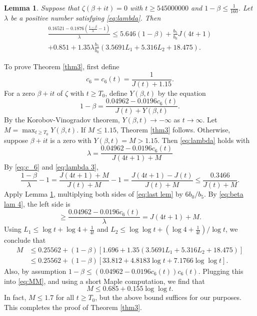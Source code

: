 \documentclass[10pt]{amsart}
\theoremstyle{remark}
\theoremstyle{plain}
\newtheorem{lemma}{Lemma}[section]
\numberwithin{equation}{section}
\theoremstyle{definition}
\def\lam{\lambda}
\newcommand{\be}{\begin{equation}}
\begin{document}
%
%

\begin{lemma}\label{lem:zero inequality clas}
Suppose that $\zeta(\beta+it)=0$ with $t\ge 545000000$ and $1-\beta\le 
\tfrac{1}{160}$.  Let $\lam$ be a positive number satisfying \eqref{eq:lambda}.
 Then
\begin{multline}
\frac{0.16521-0.1876(\tfrac{1-\beta}{\lam}-1)}{\lam} \le 5.646(1-\beta)
   +\frac{b_5}{b_0} J(4t+1) \\
+ 0.851+ 1.35\lam \frac{b_5}{b_0} (3.5691L_1+5.316L_2+18.475).
\label{eq:last lem}
\end{multline}
\end{lemma}

To prove Theorem \ref{thm3}, first define
\be
c_6 = c_6(t) = \frac{1}{J(t)+1.15}.
\label{eq:c_6}
\end{equation}
For a zero $\beta+it$ of $\zeta$ with $t\ge T_0$, define $Y(\beta,t)$ by
the equation
$$
1-\beta = \frac{0.04962-0.0196 c_6(t)}{J(t) + Y(\beta,t)}.
$$
By the Korobov-Vinogradov theorem, $Y(\beta,t) \to -\infty$ as $t\to \infty$.
Let $M=\max_{t\ge T_0} Y(\beta,t)$.  If $M \le 1.15$, Theorem \ref{thm3}
follows.  Otherwise, suppose $\beta+it$ is a zero with $Y(\beta,t)=M>1.15$.
Then \eqref{eq:lambda} holds with
\be
\lam = \frac{0.04962-0.0196 c_6(t)}{J(4t+1)+M}
\label{eq:lambda 3}
\end{equation}
By \eqref{eq:c_6} and \eqref{eq:lambda 3},
\be
\frac{1-\beta}{\lam}-1  = \frac{J(4t+1)+M}{J(t)+M}-1=\frac{J(4t+1)-J(t)}
{J(t)+M} \le \frac{0.3466}{J(t)+M}.
\label{eq:beta lam 4}
\end{equation}
Apply Lemma \ref{lem:zero inequality clas}, multiplying both sides of
\eqref{eq:last lem} by $6b_0/b_5$.  By \eqref{eq:beta lam 4}, the left side is
$$
\ge \frac{0.04962-0.0196c_6(t)}{\lam} = J(4t+1)+M.
$$
Using $L_1 \le \log t + \log 4 + \frac{1}{4t}$ and $L_2 \le \log\log t +
(\log 4 + \frac{1}{4t})/\log t$, we conclude that
\be
\begin{split}
M&\le 0.25562+(1-\beta) \left[ 1.696+1.35(3.5691L_1+5.316L_2+18.475) \right] \\
&\le 0.25562+(1-\beta) \left[ 33.812+4.8183\log t + 7.1766\log\log t \right].
\end{split}
\label{eq:MM}
\end{equation}
Also, by assumption $1-\beta \le (0.04962-0.0196c_6(t)) c_6(t)$. 
Plugging this into \eqref{eq:MM}, and using a short Maple computation,
we find that 
$$
M \le 0.685+0.155\log\log t.
$$
In fact, $M\le 1.7$ for all $t\ge T_0$, but the above bound suffices for 
our purposes.  This completes the proof of Theorem \ref{thm3}.
\end{document}
